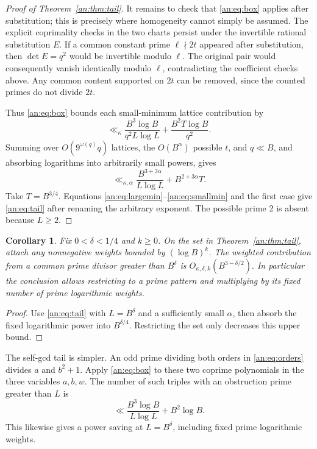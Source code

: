 \documentclass[11pt,reqno]{amsart}
\newtheorem{corollary}[theorem]{Corollary}
\theoremstyle{definition}
\numberwithin{equation}{section}
\begin{document}
\begin{proof}[Proof of Theorem~\ref{an:thm:tail}]
It remains to check that \eqref{an:eq:box} applies after substitution; this is precisely where homogeneity cannot simply be assumed. The explicit coprimality checks in the two charts persist under the invertible rational substitution $E$. If a common constant prime $\ell\nmid2t$ appeared after substitution, then $\det E=q^2$ would be invertible modulo $\ell$. The original pair would consequently vanish identically modulo $\ell$, contradicting the coefficient checks above. Any common content supported on $2t$ can be removed, since the counted primes do not divide $2t$.

Thus \eqref{an:eq:box} bounds each small-minimum lattice contribution by
\[
 \ll_{\kappa}
 \frac{B^3\log B}{q^2L\log L}
 +\frac{B^2T\log B}{q^2}.
\]
Summing over $O(9^{\omega(q)}q)$ lattices, the $O(B^\alpha)$ possible $t$, and $q\ll B$, and absorbing logarithms into arbitrarily small powers, gives
\begin{equation}\label{an:eq:smallmin}
 \ll_{\kappa,\alpha}
 \frac{B^{3+3\alpha}}{L\log L}+B^{2+3\alpha}T.
\end{equation}
Take $T=B^{3/4}$. Equations \eqref{an:eq:largemin}--\eqref{an:eq:smallmin} and the first case give \eqref{an:eq:tail} after renaming the arbitrary exponent. The possible prime 2 is absent because $L\ge2$.
\end{proof}

\begin{corollary}\label{an:cor:weightedlarge}
Fix $0<\delta<1/4$ and $k\ge0$. On the set in Theorem~\ref{an:thm:tail}, attach any nonnegative weights bounded by $(\log B)^k$. The weighted contribution from a common prime divisor greater than $B^\delta$ is $O_{\kappa,\delta,k}(B^{3-\delta/2}).$
In particular the conclusion allows restricting to a prime pattern and multiplying by its fixed number of prime logarithmic weights.
\end{corollary}
\begin{proof}
Use \eqref{an:eq:tail} with $L=B^\delta$ and a sufficiently small $\alpha$, then absorb the fixed logarithmic power into $B^{\delta/4}$. Restricting the set only decreases this upper bound.
\end{proof}

The self-gcd tail is simpler. An odd prime dividing both orders in \eqref{an:eq:orders} divides $a$ and $b^2+1$. Apply \eqref{an:eq:box} to these two coprime polynomials in the three variables $a,b,w$. The number of such triples with an obstruction prime greater than $L$ is
\[
 \ll \frac{B^3\log B}{L\log L}+B^2\log B.
\]
This likewise gives a power saving at $L=B^\delta$, including fixed prime logarithmic weights.
\end{document}
